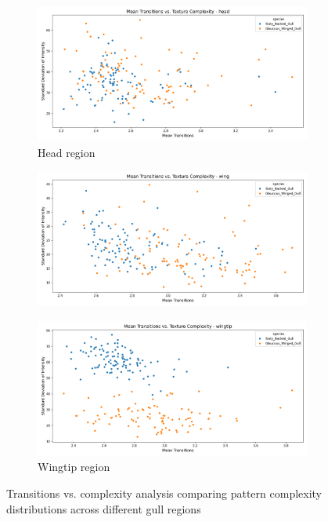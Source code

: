 \documentclass[a4paper,12pt]{report}
\begin{document}
\begin{figure}[H]
    \centering
    \begin{subfigure}[b]{0.32\textwidth}
        \centering
        \includegraphics[width=\textwidth]{images/appendix/Transitions_Analysis/default_head_transitions_vs_complexity.png}
        \caption{Head region}
        \label{fig:transitions_head_complex}
    \end{subfigure}
    \hfill
    \begin{subfigure}[b]{0.32\textwidth}
        \centering
        \includegraphics[width=\textwidth]{images/appendix/Transitions_Analysis/default_wing_transitions_vs_complexity.png}
        \label{fig:transitions_wing_complex}
    \end{subfigure}
    \hfill
    \begin{subfigure}[b]{0.32\textwidth}
        \centering
        \includegraphics[width=\textwidth]{images/appendix/Transitions_Analysis/default_wingtip_transitions_vs_complexity.png}
        \caption{Wingtip region}
        \label{fig:transitions_wingtip_complex}
    \end{subfigure}
    \caption{Transitions vs. complexity analysis comparing pattern complexity distributions across different gull regions}
    \label{fig:transitions_complexity}
\end{figure}
\end{document}
